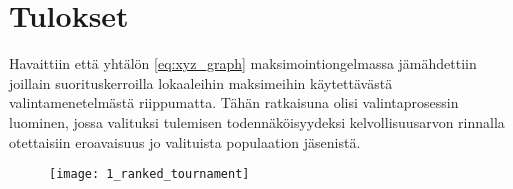\section{Tulokset}

Havaittiin että yhtälön \ref{eq:xyz_graph} maksimointiongelmassa jämähdettiin joillain suorituskerroilla lokaaleihin
maksimeihin käytettävästä valintamenetelmästä riippumatta. Tähän ratkaisuna olisi valintaprosessin luominen, jossa
valituksi tulemisen todennäköisyydeksi kelvollisuusarvon rinnalla otettaisiin eroavaisuus jo valituista populaation
jäsenistä.


\begin{figure}[H]
	\caption{}
	\centering
	\texttt{[image: 1\_ranked\_tournament]}
	\label{fig:1_ranked_tournament}
\end{figure}
